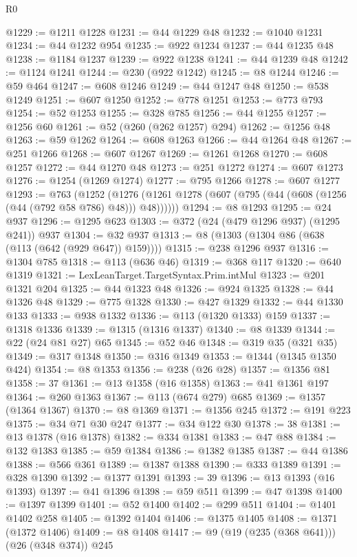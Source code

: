 \begin{lexlean}{R0}
\begin{coremodule}
{{{{{{{{{{{{{{{{{{{{{{{{{{{{{{{{{{{{{{{{{{{{{{{{{{{{{{{{{{{{{{{{{{{{{{{{{@1229 := @1211 @1228
@1231 := @44 @1229 @48
@1232 := @1040 @1231
@1234 := @44 @1232 @954
@1235 := @922 @1234
@1237 := @44 @1235 @48
@1238 := @1184 @1237
@1239 := @922 @1238
@1241 := @44 @1239 @48
@1242 := @1124 @1241
@1244 := @230 (@922 @1242)
@1245 := @8 @1244
@1246 := @59 @464
@1247 := @608 @1246
@1249 := @44 @1247 @48
@1250 := @538 @1249
@1251 := @607 @1250
@1252 := @778 @1251
@1253 := @773 @793
@1254 := @52 @1253
@1255 := @328 @785
@1256 := @44 @1255
@1257 := @1256 @60
@1261 := @52 (@260 (@262 @1257) @294)
@1262 := @1256 @48
@1263 := @59 @1262
@1264 := @608 @1263
@1266 := @44 @1264 @48
@1267 := @251 @1266
@1268 := @607 @1267
@1269 := @1261 @1268
@1270 := @608 @1257
@1272 := @44 @1270 @48
@1273 := @251 @1272
@1274 := @607 @1273
@1276 := @1254 (@1269 @1274)
@1277 := @795 @1266
@1278 := @607 @1277
@1293 := @763
    (@1252 (@1276 (@1261 @1278 (@607 (@795 (@44 (@608 (@1256 (@44 (@792 @58 @786) @48))) @48))))))
@1294 := @8 @1293
@1295 := @24 @937
@1296 := @1295 @623
@1303 := @372 (@24 (@479 @1296 @937) (@1295 @241)) @937
@1304 := @32 @937
@1313 := @8 (@1303 (@1304 @86 (@638 (@113 (@642 (@929 @647)) @159))))
@1315 := @238 @1296 @937
@1316 := @1304 @785
@1318 := @113 (@636 @46)
@1319 := @368 @117
@1320 := @640 @1319
@1321 := LexLeanTarget.TargetSyntax.Prim.intMul
@1323 := @201 @1321 @204
@1325 := @44 @1323 @48
@1326 := @924 @1325
@1328 := @44 @1326 @48
@1329 := @775 @1328
@1330 := @427 @1329
@1332 := @44 @1330 @133
@1333 := @938 @1332
@1336 := @113 (@1320 @1333) @159
@1337 := @1318 @1336
@1339 := @1315 (@1316 @1337)
@1340 := @8 @1339
@1344 := @22 (@24 @81 @27) @65
@1345 := @52 @46
@1348 := @319 @35 (@321 @35)
@1349 := @317 @1348
@1350 := @316 @1349
@1353 := @1344 (@1345 @1350 @424)
@1354 := @8 @1353
@1356 := @238 (@26 @28)
@1357 := @1356 @81
@1358 := 37
@1361 := @13 @1358 (@16 @1358)
@1363 := @41 @1361 @197
@1364 := @260 @1363
@1367 := @113 (@674 @279) @685
@1369 := @1357 (@1364 @1367)
@1370 := @8 @1369
@1371 := @1356 @245
@1372 := @191 @223
@1375 := @34 @71 @30 @247
@1377 := @34 @122 @30
@1378 := 38
@1381 := @13 @1378 (@16 @1378)
@1382 := @334 @1381
@1383 := @47 @88
@1384 := @132 @1383
@1385 := @59 @1384
@1386 := @1382 @1385
@1387 := @44 @1386
@1388 := @566 @361
@1389 := @1387 @1388
@1390 := @333 @1389
@1391 := @328 @1390
@1392 := @1377 @1391
@1393 := 39
@1396 := @13 @1393 (@16 @1393)
@1397 := @41 @1396
@1398 := @59 @511
@1399 := @47 @1398
@1400 := @1397 @1399
@1401 := @52 @1400
@1402 := @299 @511
@1404 := @1401 @1402 @258
@1405 := @1392 @1404
@1406 := @1375 @1405
@1408 := @1371 (@1372 @1406)
@1409 := @8 @1408
@1417 := @9 (@19 (@235 (@368 @641))) (@26 (@348 @374)) @245
}}}}}}}}}}}}}}}}}}}}}}}}}}}}}}}}}}}}}}}}}}}}}}}}}}}}}}}}}}}}}}}}}}}}}}}}}
\end{coremodule}
\end{lexlean}
